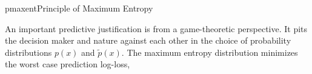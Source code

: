 \documentclass[9pt]{article}
\begin{document}
\begin{topic}{pmaxent}{Principle of Maximum Entropy}
\begin{comment}
Not totally understand this part
A second justification, suggested by Graham Wallis to Edwin Jaynes, derives the maximum entropy distribution as the most probable of all ``fair'' random distributions that match provided constraints. Consider the process of assigning probabilities $\{p_1,\ldots,p_m\}$ to $m$ different possibilities by (uniformly) randomly assigning n $\gg$ m quanta among those possibilities. If a random assignment does not match provided constraints on the distribution, a new assignment is generated until one that matches constraints is found. The most likely distribution that will be found by this process maximizes $W = \frac{n!}{n_1!\ldots n_m!}$. As $n\rightarrow \infty$, a monotonic function of $W$, $\frac{1}{n}\log W \rightarrow -\sum_{i=1}^{m}p_i\log p_i$, which is the entropy of the distribution. As a result, the most likely constraint-satisfying assignment from this process is equivalent to the maximum entropy distribution in the limit of infinitesimally small quanta of probability. Note that this derivation neither assumes nor employs any notions from information theory. Rather, information-theoretic measures follow from the derivation.
\end{comment}

An important predictive justification is from a game-theoretic perspective. It pits the decision maker and nature against each other in the choice of probability distributions $p(x)$ and $\tilde{p}(x)$. The maximum entropy distribution minimizes the worst case prediction log-loss,
\[
	\
\]

\end{topic}
\end{document}

